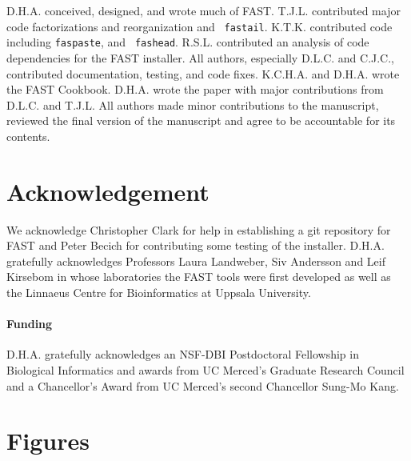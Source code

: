 \documentclass{frontiersSCNS} %
\begin{document}
D.H.A. conceived, designed, and wrote much of FAST. T.J.L. contributed
major code factorizations and reorganization and {\tt
  fastail}. K.T.K. contributed code including {\tt faspaste}, and {\tt
  fashead}. R.S.L. contributed an analysis of code dependencies for
the FAST installer. All authors, especially D.L.C. and C.J.C.,
contributed documentation, testing, and code fixes. K.C.H.A. and
D.H.A. wrote the FAST Cookbook. D.H.A. wrote the paper with major
contributions from D.L.C. and T.J.L. All authors made minor
contributions to the manuscript, reviewed the final version of the
manuscript and agree to be accountable for its contents.

\section*{Acknowledgement}
We acknowledge Christopher Clark for help in establishing a git
repository for FAST and Peter Becich for contributing some testing of
the installer. D.H.A. gratefully acknowledges Professors Laura
Landweber, Siv Andersson and Leif Kirsebom in whose laboratories the
FAST tools were first developed as well as the Linnaeus Centre for
Bioinformatics at Uppsala University.

\paragraph{Funding\textcolon} D.H.A. gratefully acknowledges an
NSF-DBI Postdoctoral Fellowship in Biological Informatics and awards
from UC Merced's Graduate Research Council and a Chancellor's Award
from UC Merced's second Chancellor Sung-Mo Kang.



\section*{Figures}
\end{document}
